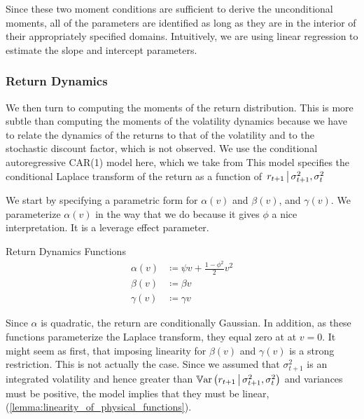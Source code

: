 \documentclass[11pt, letterpaper, twoside, final]{article}
\begin{document}
Since these two moment conditions are sufficient to derive the unconditional moments, all of the parameters are
identified as long as they are in the interior of their appropriately specified domains.
Intuitively, we are using linear regression to estimate the slope and intercept parameters.


\subsubsection{Return Dynamics}

We then turn to computing the moments of the return distribution. 
This is more subtle than computing the moments of the volatility dynamics because we have to relate the dynamics
of the returns to that of the volatility and to the stochastic discount factor, which is not observed. 
We use the conditional autoregressive CAR(1) model here, which we take from
\textcite{darolles2006structural,khrapov2016affine}
This model  specifies the conditional Laplace transform of the return as a function of $\left. r_{t+1} \,\middle\vert\,
\sigma^2_{t+1}, \sigma^2_t \right.$

We start by specifying a parametric form for $\alpha(v)$ and $\beta(v)$, and $\gamma(v)$.
We parameterize $\alpha(v)$ in the way that we do because it gives $\phi$ a nice interpretation.
It is a leverage effect parameter.

\begin{defn}{Return Dynamics Functions}
    \label{defn:physical_return_dynamics}
    \begin{align}
        \alpha(v) &\coloneqq \psi v + \frac{1 - \phi^2}{2} v^2 \\
        \beta(v) &\coloneqq \beta v  \\
        \gamma(v) &\coloneqq \gamma v  
    \end{align}
\end{defn}

Since $\alpha$ is quadratic, the return are conditionally Gaussian.
In addition, as these functions parameterize the Laplace transform, they equal zero at at $v=0$.
It might seem as first, that imposing linearity for $\beta(v)$ and $\gamma(v)$ is a strong restriction.
This is not actually the case.
Since we assumed that $\sigma^2_{t+1}$ is an integrated volatility and hence greater than $\operatorname{\mathbb{V}ar}\left(r_{t+1}
\,\middle\vert\, \sigma^2_{t+1}, \sigma^2_{t}\right)$ and variances must be positive, the model implies that they must be
linear, (\cref{lemma:linearity_of_physical_functions}).
\end{document}
